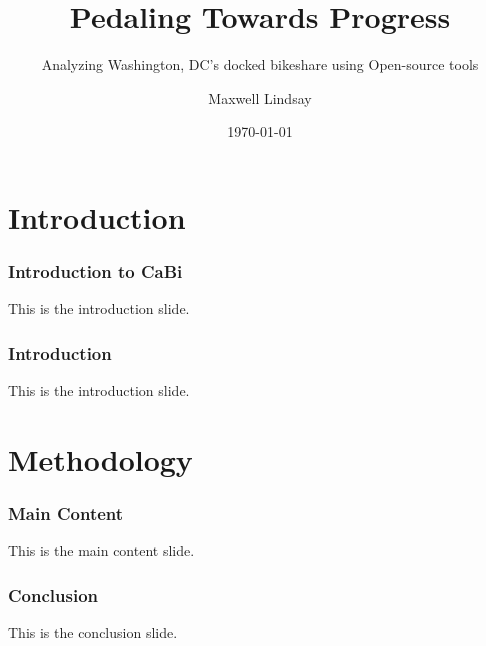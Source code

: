 \documentclass{beamer}
\title{Pedaling Towards Progress}
\subtitle{Analyzing Washington, DC's docked bikeshare using Open-source tools}
\author{Maxwell Lindsay}
\institute{Van Oord}
\date{\today}
\begin{document}
\begin{frame}
    \titlepage
\end{frame}
\section{Introduction}
\begin{frame}
    \frametitle{Introduction to CaBi}
    This is the introduction slide.
\end{frame}

\begin{frame}
    \frametitle{Introduction}
    This is the introduction slide.
\end{frame}

\section{Methodology}
\begin{frame}
    \frametitle{Main Content}
    This is the main content slide.
\end{frame}

\begin{frame}
    \frametitle{Conclusion}
    This is the conclusion slide.
\end{frame}
\end{document}

